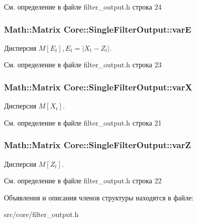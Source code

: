 См. определение в файле filter\+\_\+output.\+h строка 24

\subsubsection[{\texorpdfstring{varE}{varE}}]{\setlength{\rightskip}{0pt plus 5cm}Math\+::\+Matrix Core\+::\+Single\+Filter\+Output\+::varE}\hypertarget{struct_core_1_1_single_filter_output_ab89885f694006365cd0f8e4a1bbc6187}{}\label{struct_core_1_1_single_filter_output_ab89885f694006365cd0f8e4a1bbc6187}
Дисперсия $M[E_t], E_t = |X_t - Z_t|$. 

См. определение в файле filter\+\_\+output.\+h строка 23

\subsubsection[{\texorpdfstring{varX}{varX}}]{\setlength{\rightskip}{0pt plus 5cm}Math\+::\+Matrix Core\+::\+Single\+Filter\+Output\+::varX}\hypertarget{struct_core_1_1_single_filter_output_a31a2094b47d89df8ffd1befdf43d1f6e}{}\label{struct_core_1_1_single_filter_output_a31a2094b47d89df8ffd1befdf43d1f6e}
Дисперсия $M[X_t]$. 

См. определение в файле filter\+\_\+output.\+h строка 21

\subsubsection[{\texorpdfstring{varZ}{varZ}}]{\setlength{\rightskip}{0pt plus 5cm}Math\+::\+Matrix Core\+::\+Single\+Filter\+Output\+::varZ}\hypertarget{struct_core_1_1_single_filter_output_aa0b4c0793c1277fe75e19fd96dc4cde4}{}\label{struct_core_1_1_single_filter_output_aa0b4c0793c1277fe75e19fd96dc4cde4}
Дисперсия $M[Z_t]$. 

См. определение в файле filter\+\_\+output.\+h строка 22



Объявления и описания членов структуры находятся в файле\+:\begin{DoxyCompactItemize}
\item 
src/core/filter\+\_\+output.\+h\end{DoxyCompactItemize}
